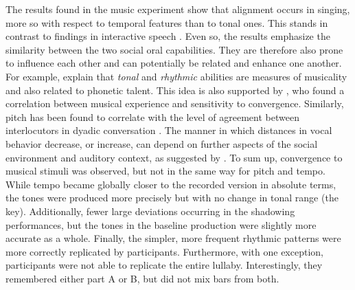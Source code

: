 The results found in the music experiment show that alignment occurs in singing, more so with respect to temporal features than to tonal ones.
This stands in contrast to findings in interactive speech \citep[e.g.,][]{Raveh2019InterspeechAlexa}.
Even so, the results emphasize the similarity between the two social oral capabilities.
They are therefore also prone to influence each other and can potentially be related and enhance one another.
For example, \citet[][p.\ 216]{Nardo2009musicality} explain that \emph{tonal} and \emph{rhythmic} abilities are measures of musicality and also related to phonetic talent.
This idea is also supported by \citet{Tsang2018musical}, who found a correlation between musical experience and sensitivity to convergence.
Similarly, pitch has been found to correlate with the level of agreement between interlocutors in dyadic conversation \citep{Okada2012interpreting}.
The manner in which distances in vocal behavior decrease, or increase, can depend on further aspects of the social environment and auditory context, as suggested by \citet{Noy1999psychoanalysis}.
To sum up, convergence to musical stimuli was observed, but not in the same way for pitch and tempo.
While tempo became globally closer to the recorded version in absolute terms, the tones were produced more precisely but with no change in tonal range (the key).
Additionally, fewer large deviations occurring in the shadowing performances, but the tones in the baseline production were slightly more accurate as a whole.
Finally, the simpler, more frequent rhythmic patterns were more correctly replicated by participants.
Furthermore, with one exception, participants were not able to replicate the entire lullaby.
Interestingly, they remembered either part A or B, but did not mix bars from both.

